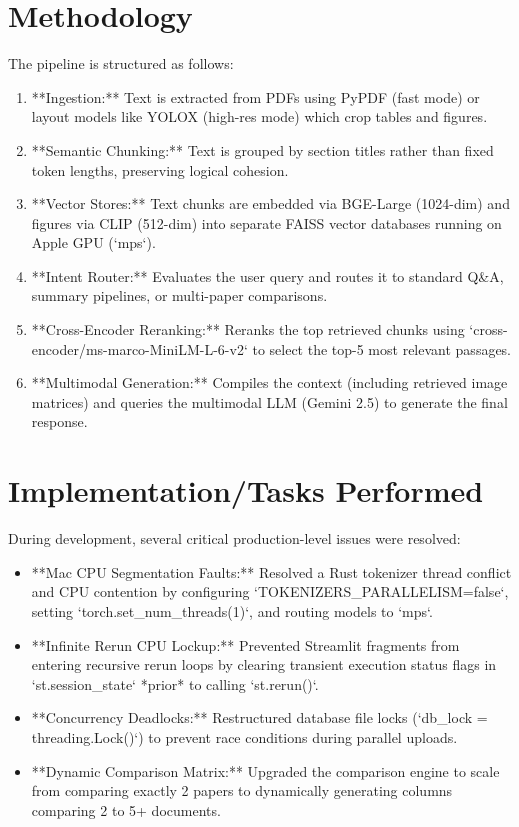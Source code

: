 \documentclass[12pt]{report}
\begin{document}
{\section{Methodology}
The pipeline is structured as follows:
\begin{enumerate}
    \item **Ingestion:** Text is extracted from PDFs using PyPDF (fast mode) or layout models like YOLOX (high-res mode) which crop tables and figures.
    \item **Semantic Chunking:** Text is grouped by section titles rather than fixed token lengths, preserving logical cohesion.
    \item **Vector Stores:** Text chunks are embedded via BGE-Large (1024-dim) and figures via CLIP (512-dim) into separate FAISS vector databases running on Apple GPU (`mps`).
    \item **Intent Router:** Evaluates the user query and routes it to standard Q&A, summary pipelines, or multi-paper comparisons.
    \item **Cross-Encoder Reranking:** Reranks the top retrieved chunks using `cross-encoder/ms-marco-MiniLM-L-6-v2` to select the top-5 most relevant passages.
    \item **Multimodal Generation:** Compiles the context (including retrieved image matrices) and queries the multimodal LLM (Gemini 2.5) to generate the final response.
\end{enumerate}

\section{Implementation/Tasks Performed}
During development, several critical production-level issues were resolved:
\begin{itemize}
    \item **Mac CPU Segmentation Faults:** Resolved a Rust tokenizer thread conflict and CPU contention by configuring `TOKENIZERS_PARALLELISM=false`, setting `torch.set_num_threads(1)`, and routing models to `mps`.
    \item **Infinite Rerun CPU Lockup:** Prevented Streamlit fragments from entering recursive rerun loops by clearing transient execution status flags in `st.session_state` *prior* to calling `st.rerun()`.
    \item **Concurrency Deadlocks:** Restructured database file locks (`db_lock = threading.Lock()`) to prevent race conditions during parallel uploads.
    \item **Dynamic Comparison Matrix:** Upgraded the comparison engine to scale from comparing exactly 2 papers to dynamically generating columns comparing 2 to 5+ documents.
\end{itemize}

}
\end{document}

